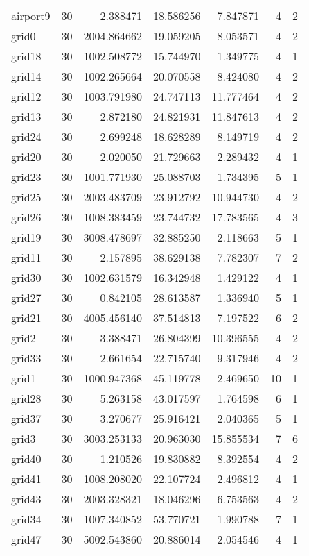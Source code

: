 \documentclass[../../../thesis.tex]{subfiles}
\begin{document}
\begin{longtable}{|l|r|r|r|r|r|r|}
airport9 & 30 & 2.388471 & 18.586256 & 7.847871 & 4 & 2 \\
grid0 & 30 & 2004.864662 & 19.059205 & 8.053571 & 4 & 2 \\
grid18 & 30 & 1002.508772 & 15.744970 & 1.349775 & 4 & 1 \\
grid14 & 30 & 1002.265664 & 20.070558 & 8.424080 & 4 & 2 \\
grid12 & 30 & 1003.791980 & 24.747113 & 11.777464 & 4 & 2 \\
grid13 & 30 & 2.872180 & 24.821931 & 11.847613 & 4 & 2 \\
grid24 & 30 & 2.699248 & 18.628289 & 8.149719 & 4 & 2 \\
grid20 & 30 & 2.020050 & 21.729663 & 2.289432 & 4 & 1 \\
grid23 & 30 & 1001.771930 & 25.088703 & 1.734395 & 5 & 1 \\
grid25 & 30 & 2003.483709 & 23.912792 & 10.944730 & 4 & 2 \\
grid26 & 30 & 1008.383459 & 23.744732 & 17.783565 & 4 & 3 \\
grid19 & 30 & 3008.478697 & 32.885250 & 2.118663 & 5 & 1 \\
grid11 & 30 & 2.157895 & 38.629138 & 7.782307 & 7 & 2 \\
grid30 & 30 & 1002.631579 & 16.342948 & 1.429122 & 4 & 1 \\
grid27 & 30 & 0.842105 & 28.613587 & 1.336940 & 5 & 1 \\
grid21 & 30 & 4005.456140 & 37.514813 & 7.197522 & 6 & 2 \\
grid2 & 30 & 3.388471 & 26.804399 & 10.396555 & 4 & 2 \\
grid33 & 30 & 2.661654 & 22.715740 & 9.317946 & 4 & 2 \\
grid1 & 30 & 1000.947368 & 45.119778 & 2.469650 & 10 & 1 \\
grid28 & 30 & 5.263158 & 43.017597 & 1.764598 & 6 & 1 \\
grid37 & 30 & 3.270677 & 25.916421 & 2.040365 & 5 & 1 \\
grid3 & 30 & 3003.253133 & 20.963030 & 15.855534 & 7 & 6 \\
grid40 & 30 & 1.210526 & 19.830882 & 8.392554 & 4 & 2 \\
grid41 & 30 & 1008.208020 & 22.107724 & 2.496812 & 4 & 1 \\
grid43 & 30 & 2003.328321 & 18.046296 & 6.753563 & 4 & 2 \\
grid34 & 30 & 1007.340852 & 53.770721 & 1.990788 & 7 & 1 \\
grid47 & 30 & 5002.543860 & 20.886014 & 2.054546 & 4 & 1 \\

\end{longtable}
\end{document}
